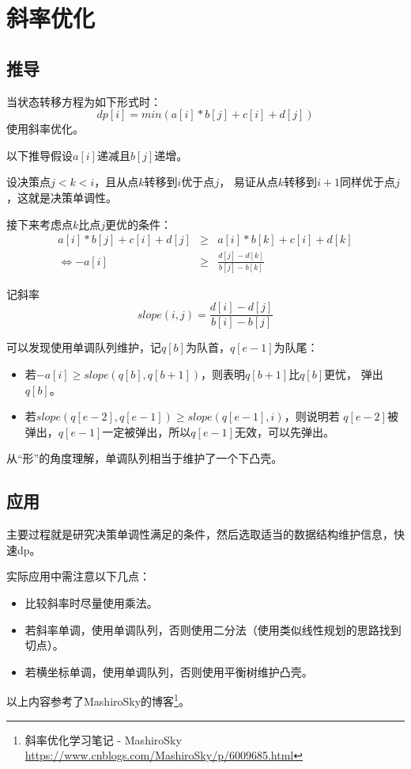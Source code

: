 \section{斜率优化}
\subsection{推导}
当状态转移方程为如下形式时：
\begin{displaymath}
    dp[i]=min(a[i]*b[j]+c[i]+d[j])
\end{displaymath}
使用斜率优化。

以下推导假设$a[i]$递减且$b[j]$递增。

设决策点$j<k<i$，且从点$k$转移到$i$优于点$j$，
易证从点$k$转移到$i+1$同样优于点$j$，这就是决策单调性。

接下来考虑点$k$比点$j$更优的条件：
\begin{eqnarray*}
    a[i]*b[j]+c[i]+d[j]&\geq&a[i]*b[k]+c[i]+d[k]\\
    \Leftrightarrow -a[i]&\geq&\frac{d[j]-d[k]}{b[j]-b[k]}
\end{eqnarray*}

记斜率
\begin{displaymath}
    slope(i,j)=\frac{d[i]-d[j]}{b[i]-b[j]}
\end{displaymath}

可以发现使用单调队列维护，记$q[b]$为队首，$q[e-1]$为队尾：
\begin{itemize}
    \item 若$-a[i]\geq slope(q[b],q[b+1])$，则表明$q[b+1]$比$q[b]$更忧，
    弹出$q[b]$。
    \item 若$slope(q[e-2],q[e-1])\geq slope(q[e-1],i)$，则说明若
    $q[e-2]$被弹出，$q[e-1]$一定被弹出，所以$q[e-1]$无效，可以先弹出。
\end{itemize}

从``形''的角度理解，单调队列相当于维护了一个下凸壳。
\subsection{应用}
主要过程就是研究决策单调性满足的条件，然后选取适当的数据结构维护信息，快速dp。

实际应用中需注意以下几点：
\begin{itemize}
    \item 比较斜率时尽量使用乘法。
    \item 若斜率单调，使用单调队列，否则使用二分法（使用类似线性规划的思路找到切点）。
    \item 若横坐标单调，使用单调队列，否则使用平衡树维护凸壳。
\end{itemize}

以上内容参考了MashiroSky的博客\footnote{斜率优化学习笔记 - MashiroSky
    \url{https://www.cnblogs.com/MashiroSky/p/6009685.html}
}。
